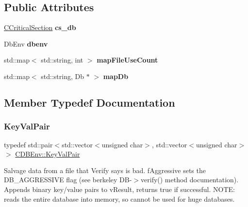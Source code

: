 \subsection*{Public Attributes}
\begin{DoxyCompactItemize}
\item 
\mbox{\label{class_c_d_b_env_af71bf28f9142c38aedc550353270b2b7}} 
\mbox{\hyperlink{class_annotated_mixin}{C\+Critical\+Section}} {\bfseries cs\+\_\+db}
\item 
\mbox{\label{class_c_d_b_env_a50a70690e7f688f5e92a972e7fa18668}} 
Db\+Env {\bfseries dbenv}
\item 
\mbox{\label{class_c_d_b_env_a3b8a3caf48395ef3f05e3717b33bf32c}} 
std\+::map$<$ std\+::string, int $>$ {\bfseries map\+File\+Use\+Count}
\item 
\mbox{\label{class_c_d_b_env_a89184b6635285b963fa4d80fc292b386}} 
std\+::map$<$ std\+::string, Db $\ast$ $>$ {\bfseries map\+Db}
\end{DoxyCompactItemize}


\subsection{Member Typedef Documentation}
\mbox{\label{class_c_d_b_env_a53fd285f09c312973caa6f90b33937f5}} 
\subsubsection{\texorpdfstring{Key\+Val\+Pair}{KeyValPair}}
{\footnotesize\ttfamily typedef std\+::pair$<$std\+::vector$<$unsigned char$>$, std\+::vector$<$unsigned char$>$ $>$ \mbox{\hyperlink{class_c_d_b_env_a53fd285f09c312973caa6f90b33937f5}{C\+D\+B\+Env\+::\+Key\+Val\+Pair}}}

Salvage data from a file that Verify says is bad. f\+Aggressive sets the D\+B\+\_\+\+A\+G\+G\+R\+E\+S\+S\+I\+VE flag (see berkeley D\+B-\/$>$verify() method documentation). Appends binary key/value pairs to v\+Result, returns true if successful. N\+O\+TE\+: reads the entire database into memory, so cannot be used for huge databases. 

